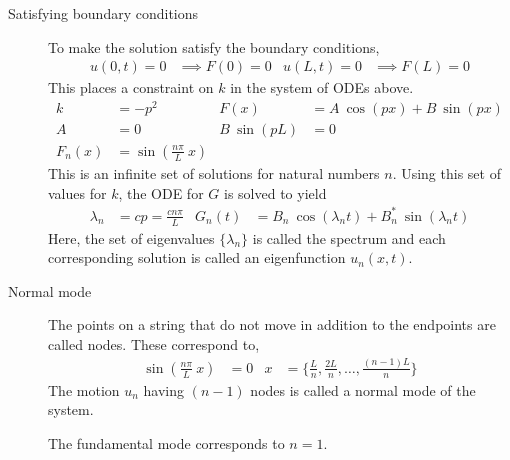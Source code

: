 \begin{description}
    \item[Satisfying boundary conditions] To make the solution satisfy the boundary
        conditions,
        \begin{align}
            u(0, t) = 0 & \implies F(0) = 0 &
            u(L, t) = 0 & \implies F(L) = 0
        \end{align}
        This places a constraint on $ k $ in the system of ODEs above.
        \begin{align}
            k           & = -p^2                                 &
            F(x)        & = A\ \cos(px) + B\ \sin(px)              \\
            A           & = 0                                    &
            B\ \sin(pL) & = 0                                      \\
            F_n(x)      & = \sin\left( \frac{n\pi}{L}\ x \right)
        \end{align}
        This is an infinite set of solutions for natural numbers $ n $.
        Using this set of values for $ k $, the ODE for $ G $ is solved to yield
        \begin{align}
            \lambda_n & = cp = \frac{cn\pi}{L}                              &
            G_n(t)    & = B_n\ \cos(\lambda_n t) + B_n^*\ \sin(\lambda_n t)
        \end{align}
        Here, the set of eigenvalues $ \{\lambda_n\} $ is called the spectrum and each
        corresponding solution is called an eigenfunction $ u_n(x, t) $.

    \item[Normal mode] The points on a string that do not move in addition to the
        endpoints are called nodes. These correspond to,
        \begin{align}
            \sin\left( \frac{n\pi}{L}\ x \right) & = 0                                &
            x                                    & = \Bigg\{\frac{L}{n}, \frac{2L}{n}
            , \dots , \frac{(n-1)L}{n}\Bigg\}
        \end{align}
        The motion $ u_n $ having $ (n-1) $ nodes is called a normal mode of the system.
        \par The fundamental mode corresponds to $ n = 1 $.


\end{description}
